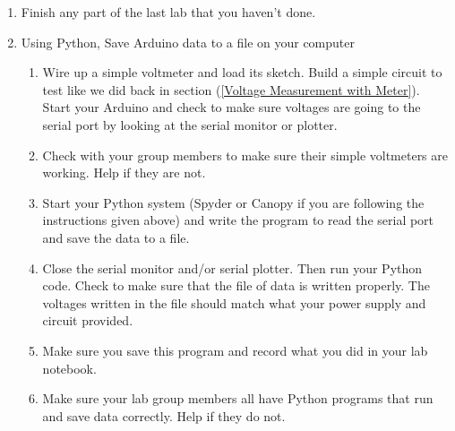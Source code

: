 \begin{enumerate}
\item Finish any part of the last lab that you haven't done.

\item Using Python, Save Arduino data to a file on your computer

	\begin{enumerate}
	\item Wire up a simple voltmeter and load its sketch. Build a simple circuit
	to test like we did back in section (\ref{Voltage Measurement with Meter}).
	Start your Arduino and check to make sure voltages are going to the serial
	port by looking at the serial monitor or plotter.
	
	\item Check with your group members to make sure their simple voltmeters are
	working. Help if they are not.
	
	\item Start your Python system (Spyder or Canopy if you are following the
	instructions given above) and write the program to read the serial port and
	save the data to a file.
	
	\item Close the serial monitor and/or serial plotter. Then run your Python
	code. Check to make sure that the file of data is written properly. The
	voltages written in the file should match what your power supply and circuit
	provided.
	
	\item Make sure you save this program and record what you did in your lab
	notebook.
	
	\item Make sure your lab group members all have Python programs that run and
	save data correctly. Help if they do not.
	\end{enumerate}

\end{enumerate}
